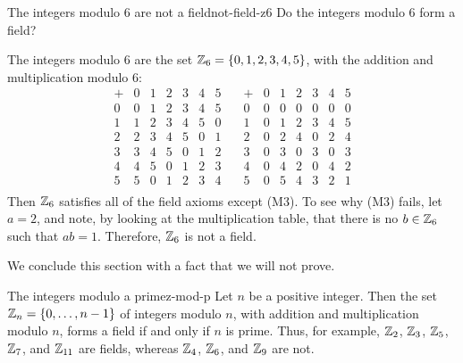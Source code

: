 \begin{example}{The integers modulo 6 are not a field}{not-field-z6}
  Do the integers modulo 6 form a field?
\end{example}

\begin{solution}
  The integers modulo 6 are the set $\mathbb{Z}_6=\left\{0,1,2,3,4,5\right\}$, with the
  addition and multiplication modulo 6:
  \begin{equation*}
    \begin{array}{l|llllll}
      +&0&1&2&3&4&5 \\\hline
      0&0&1&2&3&4&5 \\
      1&1&2&3&4&5&0 \\
      2&2&3&4&5&0&1 \\
      3&3&4&5&0&1&2 \\
      4&4&5&0&1&2&3 \\
      5&5&0&1&2&3&4 \\
    \end{array}
    \quad
    \begin{array}{l|llllll}
      +&0&1&2&3&4&5 \\\hline
      0&0&0&0&0&0&0 \\
      1&0&1&2&3&4&5 \\
      2&0&2&4&0&2&4 \\
      3&0&3&0&3&0&3 \\
      4&0&4&2&0&4&2 \\
      5&0&5&4&3&2&1 \\
    \end{array}
  \end{equation*}
  Then $\mathbb{Z}_6$ satisfies all of the field axioms except
  (M3). To see why (M3) fails, let $a=2$, and note, by looking at the
  multiplication table, that there is no $b\in\mathbb{Z}_6$ such that
  $ab=1$. Therefore, $\mathbb{Z}_6$ is not a field.
\end{solution}

We conclude this section with a fact that we will not prove.

\begin{theorem}{The integers modulo a prime}{z-mod-p}
  Let $n$ be a positive integer. Then the set
  $\mathbb{Z}_n=\left\{0,\ldots,n-1\right\}$ of integers modulo $n$, with
  addition and multiplication modulo $n$, forms a field if and only if
  $n$ is prime. Thus, for example, $\mathbb{Z}_2$, $\mathbb{Z}_3$,
  $\mathbb{Z}_5$, $\mathbb{Z}_7$, and $\mathbb{Z}_{11}$ are fields,
  whereas $\mathbb{Z}_4$, $\mathbb{Z}_6$, and $\mathbb{Z}_9$ are not.
\end{theorem}

